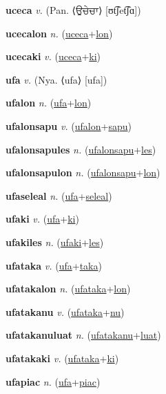 \textbf{\hypertarget{uceca}{uceca}} \textit{v.} (Pan. ⟨{\gurmukhi{}ਉਚੇਚਾ}⟩ [ʊt͡ʃet͡ʃɑ])


\textbf{\hypertarget{ucecalon}{ucecalon}} \textit{n.} (\hyperlink{uceca}{uceca}+\allowbreak \hyperlink{lon}{lon})


\textbf{\hypertarget{ucecaki}{ucecaki}} \textit{v.} (\hyperlink{uceca}{uceca}+\allowbreak \hyperlink{ki}{ki})


\textbf{\hypertarget{ufa}{ufa}} \textit{v.} (Nya. ⟨ufa⟩ [ufa])


\textbf{\hypertarget{ufalon}{ufalon}} \textit{n.} (\hyperlink{ufa}{ufa}+\allowbreak \hyperlink{lon}{lon})


\textbf{\hypertarget{ufalonsapu}{ufalonsapu}} \textit{v.} (\hyperlink{ufalon}{ufalon}+\allowbreak \hyperlink{sapu}{sapu})


\textbf{\hypertarget{ufalonsapules}{ufalonsapules}} \textit{n.} (\hyperlink{ufalonsapu}{ufalonsapu}+\allowbreak \hyperlink{les}{les})


\textbf{\hypertarget{ufalonsapulon}{ufalonsapulon}} \textit{n.} (\hyperlink{ufalonsapu}{ufalonsapu}+\allowbreak \hyperlink{lon}{lon})


\textbf{\hypertarget{ufaseleal}{ufaseleal}} \textit{n.} (\hyperlink{ufa}{ufa}+\allowbreak \hyperlink{seleal}{seleal})


\textbf{\hypertarget{ufaki}{ufaki}} \textit{v.} (\hyperlink{ufa}{ufa}+\allowbreak \hyperlink{ki}{ki})


\textbf{\hypertarget{ufakiles}{ufakiles}} \textit{n.} (\hyperlink{ufaki}{ufaki}+\allowbreak \hyperlink{les}{les})


\textbf{\hypertarget{ufataka}{ufataka}} \textit{v.} (\hyperlink{ufa}{ufa}+\allowbreak \hyperlink{taka}{taka})


\textbf{\hypertarget{ufatakalon}{ufatakalon}} \textit{n.} (\hyperlink{ufataka}{ufataka}+\allowbreak \hyperlink{lon}{lon})


\textbf{\hypertarget{ufatakanu}{ufatakanu}} \textit{v.} (\hyperlink{ufataka}{ufataka}+\allowbreak \hyperlink{nu}{nu})


\textbf{\hypertarget{ufatakanuluat}{ufatakanuluat}} \textit{n.} (\hyperlink{ufatakanu}{ufatakanu}+\allowbreak \hyperlink{luat}{luat})


\textbf{\hypertarget{ufatakaki}{ufatakaki}} \textit{v.} (\hyperlink{ufataka}{ufataka}+\allowbreak \hyperlink{ki}{ki})


\textbf{\hypertarget{ufapiac}{ufapiac}} \textit{n.} (\hyperlink{ufa}{ufa}+\allowbreak \hyperlink{piac}{piac})


